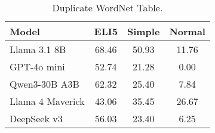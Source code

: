 \documentclass{article}%
\begin{document}
%
\normalsize%


\begin{table}[h!]%
\centering%
\small%
\setlength{\tabcolsep}{4pt}%
\begin{tabular}{@{}l c c c@{}}%
\toprule%
\textbf{Model}&\textbf{ELI5}&\textbf{Simple}&\textbf{Normal}\\%
\midrule%
Llama 3.1 8B&68.46&50.93&11.76\\%
GPT{-}4o mini&52.74&21.28&0.00\\%
Qwen3{-}30B A3B&62.32&25.40&7.84\\%
Llama 4 Maverick&43.06&35.45&26.67\\%
DeepSeek v3&56.03&23.40&6.25\\\bottomrule%
%
\end{tabular}%
\caption{Duplicate WordNet Table.}%
\end{table}

%
\end{document}
